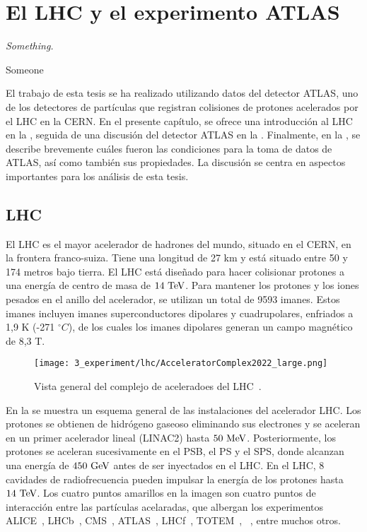 \chapter{El LHC y el experimento ATLAS}
\label{ch:atlas}

\epigraph{\emph{Something.}}{Someone}

El trabajo de esta tesis se ha realizado utilizando datos del detector \ac{ATLAS}, uno de los detectores de partículas que registran colisiones de protones acelerados por el \acf{LHC} en la \ac{CERN}.
En el presente capítulo, se ofrece una introducción al \ac{LHC} en la \Sect{\ref{sec:atlas:LHC}}, seguida de una discusión del detector \ac{ATLAS} en la \Sect{\ref{sec:atlas:atlas}}. Finalmente, en la \Sect{\ref{sec:atlas:runs}}, se describe brevemente cu\'ales fueron las condiciones para la toma de datos de \ac{ATLAS}, as\'i como tambi\'en sus propiedades. La discusión se centra en aspectos importantes para los análisis de esta tesis.




\section{LHC}
\label{sec:atlas:LHC}

El \ac{LHC} \cite{LHC-TDR,LHC-Machine} es el mayor acelerador de hadrones del mundo, situado en el \ac{CERN}, en la frontera franco-suiza. Tiene una longitud de 27 km y está situado entre 50 y 174 metros bajo tierra.
El \ac{LHC} está diseñado para hacer colisionar protones a una energía de centro de masa de \(14~\text{TeV}\). Para mantener los protones y los iones pesados en el anillo del acelerador, se utilizan un total de 9593 imanes. Estos imanes incluyen imanes superconductores dipolares y cuadrupolares, enfriados a 1,9 K (-271 $^{\circ} C$), de los cuales los imanes dipolares generan un campo magnético de 8,3 T.

\begin{figure}[ht!]
    \centering
    \texttt{[image: 3\_experiment/lhc/AcceleratorComplex2022\_large.png]}
    \caption{Vista general del complejo de aceleradoes del \ac{LHC}~\cite{LHC-complex}.}
    \label{fig:atlas:lhc:lhc}
\end{figure}

En la \Fig{\ref{fig:atlas:lhc:lhc}} se muestra un esquema general de las instalaciones del acelerador \ac{LHC}. Los protones se obtienen de hidrógeno gaseoso eliminando sus electrones y se aceleran en un primer acelerador lineal (LINAC2) hasta \(50~\text{MeV}\). Posteriormente, los protones se aceleran sucesivamente en el \ac{PSB}, el \ac{PS} y el \ac{SPS}, donde alcanzan una energía de \(450~\text{GeV}\) antes de ser inyectados en el \ac{LHC}. En el \ac{LHC}, 8 cavidades de radiofrecuencia pueden impulsar la energía de los protones hasta \(14~\text{TeV}\). Los cuatro puntos amarillos en la imagen \Fig{\ref{fig:atlas:lhc:lhc}} son cuatro puntos de interacción entre las part\'iculas acelaradas, que albergan los experimentos \acs{ALICE}~\cite{ALICE}, \acs{LHCb}~\cite{LHCb}, \acs{CMS}~\cite{CMS}, \acs{ATLAS}~\cite{ATLAS}, \acs{LHCf}~\cite{LHCf}, \acs{TOTEM}~\cite{TOTEM}, ~\cite{MoEDAL}, entre muchos otros.

